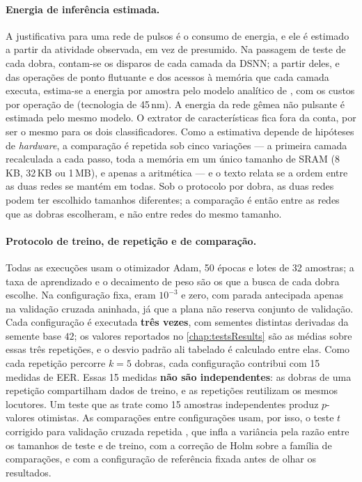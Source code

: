 				\paragraph{Energia de inferência estimada.} A justificativa para uma rede de pulsos é o consumo de energia, e ele é estimado a partir da atividade observada, em vez de presumido. Na passagem de teste de cada dobra, contam-se os disparos de cada camada da \ac{DSNN}; a partir deles, e das operações de ponto flutuante e dos acessos à memória que cada camada executa, estima-se a energia por amostra pelo modelo analítico de , com os custos por operação de  (tecnologia de 45\,nm). A energia da rede gêmea não pulsante é estimada pelo mesmo modelo. O extrator de características fica fora da conta, por ser o mesmo para os dois classificadores. Como a estimativa depende de hipóteses de \textit{hardware}, a comparação é repetida sob cinco variações --- a primeira camada recalculada a cada passo, toda a memória em um único tamanho de SRAM (8\,KB, 32\,KB ou 1\,MB), e apenas a aritmética --- e o texto relata se a ordem entre as duas redes se mantém em todas. Sob o protocolo por dobra, as duas redes podem ter escolhido tamanhos diferentes; a comparação é então entre as redes que as dobras escolheram, e não entre redes do mesmo tamanho.

				\paragraph{Protocolo de treino, de repetição e de comparação.} Todas as execuções usam o otimizador Adam, 50 épocas e lotes de 32 amostras; a taxa de aprendizado e o decaimento de peso são os que a busca de cada dobra escolhe. Na configuração fixa, eram $10^{-3}$ e zero, com parada antecipada apenas na validação cruzada aninhada, já que a plana não reserva conjunto de validação. Cada configuração é executada \textbf{três vezes}, com sementes distintas derivadas da semente base $42$; os valores reportados no \autoref{chap:testsResults} são as médias sobre essas três repetições, e o desvio padrão ali tabelado é calculado entre elas. Como cada repetição percorre $k=5$ dobras, cada configuração contribui com 15 medidas de \ac{EER}. Essas 15 medidas \textbf{não são independentes}: as dobras de uma repetição compartilham dados de treino, e as repetições reutilizam os mesmos locutores. Um teste que as trate como 15 amostras independentes produz $p$-valores otimistas. As comparações entre configurações usam, por isso, o teste $t$ corrigido para validação cruzada repetida \cite{nadeau2003inference}, que infla a variância pela razão entre os tamanhos de teste e de treino, com a correção de Holm \cite{holm1979simple} sobre a família de comparações, e com a configuração de referência fixada antes de olhar os resultados.

